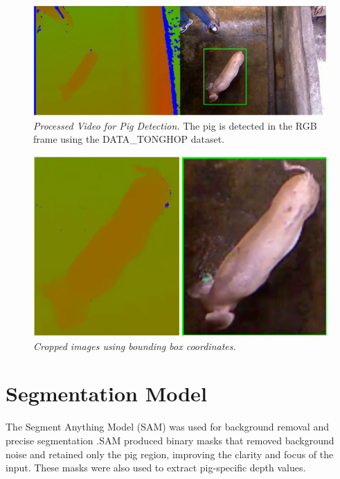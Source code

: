 {\begin{figure}[h]
	\centering
	\includegraphics[height=0.25\textheight]{figures/Processed Video}
	\caption{\textit{Processed Video for Pig Detection.} The pig is detected in the RGB frame using the DATA\_TONGHOP dataset.}
	\label{fig:processed video}
\end{figure}

\begin{figure}[h]
	\centering
	\includegraphics[height=0.25\textheight]{figures/Cropped images}
	\caption{\textit{Cropped images using bounding box coordinates.}}
	\label{fig:cropped images}
\end{figure}

\section{Segmentation Model}
The Segment Anything Model (SAM) was used for background removal and precise segmentation \citep{kirillov2023segment_anything}.SAM produced binary masks that removed background noise and retained only the pig region, improving the clarity and focus of the input. These masks were also used to extract pig-specific depth values.

}
